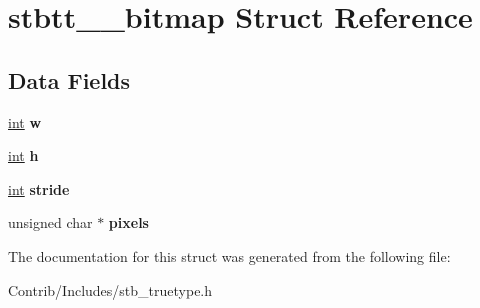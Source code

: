 \hypertarget{structstbtt____bitmap}{}\section{stbtt\+\_\+\+\_\+bitmap Struct Reference}
\label{structstbtt____bitmap}
\subsection*{Data Fields}
\begin{DoxyCompactItemize}
\item 
\hyperlink{_s_d_l__thread_8h_a6a64f9be4433e4de6e2f2f548cf3c08e}{int} {\bfseries w}\hypertarget{structstbtt____bitmap_aac374e320caaadeca4874add33b62af2}{}\label{structstbtt____bitmap_aac374e320caaadeca4874add33b62af2}

\item 
\hyperlink{_s_d_l__thread_8h_a6a64f9be4433e4de6e2f2f548cf3c08e}{int} {\bfseries h}\hypertarget{structstbtt____bitmap_a16611451551e3d15916bae723c3f59f7}{}\label{structstbtt____bitmap_a16611451551e3d15916bae723c3f59f7}

\item 
\hyperlink{_s_d_l__thread_8h_a6a64f9be4433e4de6e2f2f548cf3c08e}{int} {\bfseries stride}\hypertarget{structstbtt____bitmap_a08f66a6870d87afcd5dc1b60d1019692}{}\label{structstbtt____bitmap_a08f66a6870d87afcd5dc1b60d1019692}

\item 
unsigned char $\ast$ {\bfseries pixels}\hypertarget{structstbtt____bitmap_abc151ccc17d59b9d84a700b3855d4df0}{}\label{structstbtt____bitmap_abc151ccc17d59b9d84a700b3855d4df0}

\end{DoxyCompactItemize}


The documentation for this struct was generated from the following file\+:\begin{DoxyCompactItemize}
\item 
Contrib/\+Includes/stb\+\_\+truetype.\+h\end{DoxyCompactItemize}
